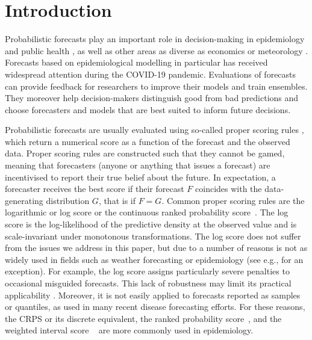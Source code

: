 \documentclass{article}
\begin{document}
\newpage


\section{Introduction}

Probabilistic forecasts \citep{heldProbabilisticForecastingInfectious2017} play an important role in decision-making in epidemiology and public health \citep{doi:10.2105/AJPH.2022.306831}, as well as other areas as diverse as economics \citep{timmermannForecastingMethodsFinance2018} or meteorology \citep{gneitingWeatherForecastingEnsemble2005}. Forecasts based on epidemiological modelling in particular has received widespread attention during the COVID-19 pandemic. Evaluations of forecasts can provide feedback for researchers to improve their models and train ensembles. They moreover help decision-makers distinguish good from bad predictions and choose forecasters and models that are best suited to inform future decisions.

Probabilistic forecasts are usually evaluated using so-called proper scoring rules \citep{gneitingStrictlyProperScoring2007}, which return a numerical score as a function of the forecast and the observed data. Proper scoring rules are constructed such that they cannot be gamed, meaning that forecasters (anyone or anything that issues a forecast) are incentivised to report their true belief about the future. In expectation, a forecaster receives the best score if their forecast $F$ coincides with the data-generating distribution $G$, that is if $F = G$. Common proper scoring rules are the logarithmic or log score \citep{goodRationalDecisions1952} or the continuous ranked probability score~\citep[CRPS,][]{gneitingStrictlyProperScoring2007}. The log score is the log-likelihood of the predictive density at the observed value and is scale-invariant under monotonous transformations. The log score does not suffer from the issues we address in this paper, but due to a number of reasons is not as widely used in fields such as weather forecasting or epidemiology (see e.g., \citealt{Johansson2019} for an exception). For example, the log score assigns particularly severe penalties to occasional misguided forecasts. This lack of robustness may limit its practical applicability \cite{bracherEvaluatingEpidemicForecasts2021}. Moreover, it is not easily applied to forecasts reported as samples or quantiles, as used in many recent disease forecasting efforts. 
For these reasons, the CRPS or its discrete equivalent, the ranked probability score~\citep[RPS,][]{funkAssessingPerformanceRealtime2019}, and the weighted interval score ~\citep[WIS,][]{bracherEvaluatingEpidemicForecasts2021} are more commonly used in epidemiology. 
\end{document}
